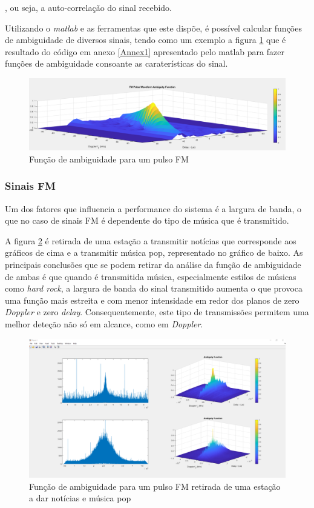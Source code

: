 , ou seja, a auto-correlação do sinal recebido.

Utilizando o \textit{matlab} e as ferramentas que este dispõe, é possível calcular funções de ambiguidade de diversos sinais, tendo como um exemplo a figura \ref{fig:ambfun_fmdef} que é resultado do código em anexo \ref{Annex1} apresentado pelo matlab para fazer funções de ambiguidade consoante as caraterísticas do sinal.
\begin{figure}[h]
\centering
\includegraphics[scale=0.4]{chapters/ch4/assets/ambfun_fmdef}
\caption[Função de ambiguidade para um pulso FM]{Função de ambiguidade para um pulso FM}
\label{fig:ambfun_fmdef}
\end{figure}


\subsubsection{Sinais FM}
Um dos fatores que influencia a performance do sistema é a largura de banda, o que no caso de sinais \gls{FM} é dependente do tipo de música que é transmitido.\par
A figura \ref{fig:ambfun2} é retirada de uma estação a transmitir notícias que corresponde aos gráficos de cima e a transmitir música pop, representado no gráfico de baixo. As principais conclusões que se podem retirar da análise da função de ambiguidade de ambas é que quando é transmitida música, especialmente estilos de músicas como \textit{hard rock}, a largura de banda do sinal transmitido aumenta o que provoca uma função mais estreita e com menor intensidade em redor dos planos de zero \textit{Doppler} e zero \textit{delay}. Consequentemente, este tipo de transmissões permitem uma melhor deteção não só em alcance, como em \textit{Doppler}.

\begin{figure}[h]
\centering
\includegraphics[scale=0.3]{chapters/ch5/assets/ambfun2}
\caption[Função de ambiguidade para uma estação FM]{Função de ambiguidade para um pulso FM retirada de uma estação a dar notícias e música pop}
\label{fig:ambfun2}
\end{figure}
 


